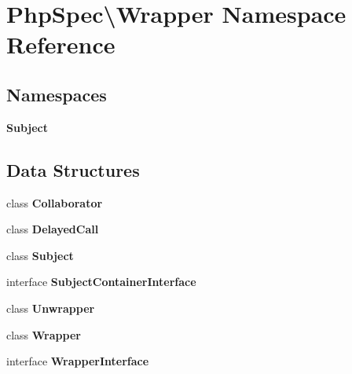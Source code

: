\section{Php\+Spec\textbackslash{}Wrapper Namespace Reference}
\label{namespace_php_spec_1_1_wrapper}
\subsection*{Namespaces}
\begin{DoxyCompactItemize}
\item 
 {\bf Subject}
\end{DoxyCompactItemize}
\subsection*{Data Structures}
\begin{DoxyCompactItemize}
\item 
class {\bf Collaborator}
\item 
class {\bf Delayed\+Call}
\item 
class {\bf Subject}
\item 
interface {\bf Subject\+Container\+Interface}
\item 
class {\bf Unwrapper}
\item 
class {\bf Wrapper}
\item 
interface {\bf Wrapper\+Interface}
\end{DoxyCompactItemize}
